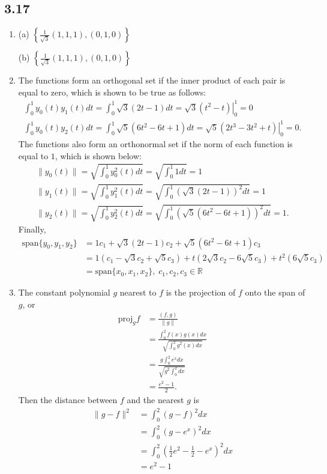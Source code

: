 \documentclass[a4paper,12pt]{article}
\begin{document}
	\subsection*{3.17}
	\begin{enumerate}
		\item (a) $\left\{ \frac{1}{\sqrt{3}}(1, 1, 1), (0, 1, 0) \right\}$ \par
		(b) $\left\{ \frac{1}{\sqrt{3}}(1, 1, 1), (0, 1, 0) \right\}$

		\setcounter{enumi}{3}
		\item The functions form an orthogonal set if the inner product of each pair is equal to zero, which is shown to be true as follows:
		\begin{gather*}
		\int_{0}^{1} y_0(t) y_1(t) dt = \int_{0}^{1} \sqrt{3}(2t - 1)dt = \left.\sqrt{3}(t^2 -t)\right\vert_{0}^{1} = 0 \\
		\int_{0}^{1} y_0(t) y_2(t) dt = \int_{0}^{1} \sqrt{5}(6t^2 - 6t + 1)dt = \left.\sqrt{5}(2t^3 - 3t^2 + t)\right\vert_{0}^{1} = 0.
		\end{gather*}
		The functions also form an orthonormal set if the norm of each function is equal to $1$, which is shown below:
		\begin{gather*}
		\|y_0(t)\| = \sqrt{\int_{0}^{1}y_0^2(t)dt} = \sqrt{\int_{0}^{1}1dt} = 1 \\
		\|y_1(t)\| = \sqrt{\int_{0}^{1}y_1^2(t)dt} = \sqrt{\int_{0}^{1}\left(\sqrt{3}(2t - 1)\right)^2dt} = 1 \\
		\|y_2(t)\| = \sqrt{\int_{0}^{1}y_2^2(t)dt} = \sqrt{\int_{0}^{1}\left(\sqrt{5}(6t^2 - 6t + 1)\right)^2dt} = 1.
		\end{gather*}
		Finally,
		\begin{align*}
		\mbox{span}\{y_0, y_1, y_2\} &= 1c_1 + \sqrt{3}(2t - 1)c_2 + \sqrt{5}(6t^2 - 6t + 1)c_3 \\
		&= 1(c_1 - \sqrt{3}c_2 + \sqrt{5}c_3) + t(2\sqrt{3}c_2 - 6\sqrt{5}c_3) + t^2(6\sqrt{5}c_3) \\
		&= \mbox{span}\{x_0, x_1, x_2\}, \; c_1, c_2, c_3 \in {\mathbb{R}}
		\end{align*}

		\setcounter{enumi}{6}
		\item The constant polynomial $g$ nearest to $f$ is the projection of $f$ onto the span of $g$, or
		\begin{align*}
		\mbox{proj}_gf &= \frac{(f, g)}{\|g\|} \\
		&= \frac{\int_{0}^{2} f(x)g(x)dx}{\sqrt{\int_{0}^{2}g^2(x)dx}} \\
		&= \frac{g\int_{0}^{2} e^xdx}{\sqrt{g^2\int_{0}^{2}dx}} \\
		&= \frac{e^2 - 1}{2}.
		\end{align*}
		Then the distance between $f$ and the nearest $g$ is
		\begin{align*}
		\|g - f\|^2 &= \int_{0}^{2}(g - f)^2dx \\
		&= \int_{0}^{2} (g - e^x)^2dx \\
		&= \int_{0}^{2} \left(\frac{1}{2}e^2 - \frac{1}{2} - e^x\right)^2dx \\
		&= e^2 - 1
		\end{align*}
	\end{enumerate}
	
\end{document}
